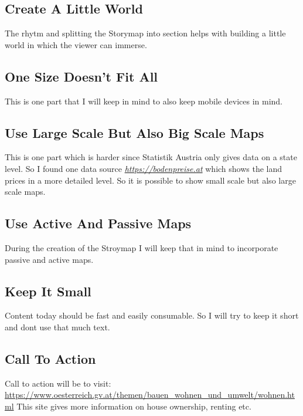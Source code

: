 \documentclass{article}
\begin{document}
\subsection*{Create A Little World}
\noindent The rhytm and splitting the Storymap into section helps with building a little world in which the viewer can immerse.

\subsection*{One Size Doesn't Fit All}
\noindent This is one part that I will keep in mind to also keep mobile devices in mind.

\subsection*{Use Large Scale But Also Big Scale Maps}
\noindent This is one part which is harder since Statistik Austria only gives data on a state level. So I found one data source \href{https://bodenpreise.at}{\textit{https://bodenpreise.at}} which shows the land prices in a more detailed level. So it is possible to show small scale but also large scale maps.

\subsection*{Use Active And Passive Maps}
\noindent During the creation of the Stroymap I will keep that in mind to incorporate passive and active maps.

\subsection*{Keep It Small}
\noindent Content today should be fast and easily consumable. So I will try to keep it short and dont use that much text.

\subsection*{Call To Action}
	\noindent Call to action will be to visit:
	\newline
	\href{https://www.oesterreich.gv.at/themen/bauen\_wohnen\_und\_umwelt/wohnen.html}{https://www.oesterreich.gv.at/themen/bauen\_wohnen\_und\_umwelt/wohnen.html}
	\noindent This site gives more information on house ownership, renting etc.
\end{document}
